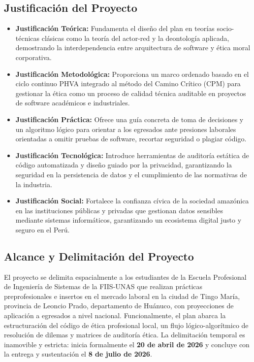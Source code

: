 \documentclass[12pt,a4paper]{article}
\begin{document}
\subsection{Justificación del Proyecto}
\begin{itemize}
    \item \textbf{Justificación Teórica:} Fundamenta el diseño del plan en teorías socio-técnicas clásicas como la teoría del actor-red y la deontología aplicada, demostrando la interdependencia entre arquitectura de software y ética moral corporativa.
    \item \textbf{Justificación Metodológica:} Proporciona un marco ordenado basado en el ciclo continuo PHVA integrado al método del Camino Crítico (CPM) para gestionar la ética como un proceso de calidad técnica auditable en proyectos de software académicos e industriales.
    \item \textbf{Justificación Práctica:} Ofrece una guía concreta de toma de decisiones y un algoritmo lógico para orientar a los egresados ante presiones laborales orientadas a omitir pruebas de software, recortar seguridad o plagiar código.
    \item \textbf{Justificación Tecnológica:} Introduce herramientas de auditoría estática de código automatizada y diseño guiado por la privacidad, garantizando la seguridad en la persistencia de datos y el cumplimiento de las normativas de la industria.
    \item \textbf{Justificación Social:} Fortalece la confianza cívica de la sociedad amazónica en las instituciones públicas y privadas que gestionan datos sensibles mediante sistemas informáticos, garantizando un ecosistema digital justo y seguro en el Perú.
\end{itemize}

\subsection{Alcance y Delimitación del Proyecto}
El proyecto se delimita espacialmente a los estudiantes de la Escuela Profesional de Ingeniería de Sistemas de la FIIS-UNAS que realizan prácticas preprofesionales e insertos en el mercado laboral en la ciudad de Tingo María, provincia de Leoncio Prado, departamento de Huánuco, con proyecciones de aplicación a egresados a nivel nacional. Funcionalmente, el plan abarca la estructuración del código de ética profesional local, un flujo lógico-algorítmico de resolución de dilemas y matrices de auditoría ética. La delimitación temporal es inamovible y estricta: inicia formalmente el \textbf{20 de abril de 2026} y concluye con la entrega y sustentación el \textbf{8 de julio de 2026}.
\end{document}
